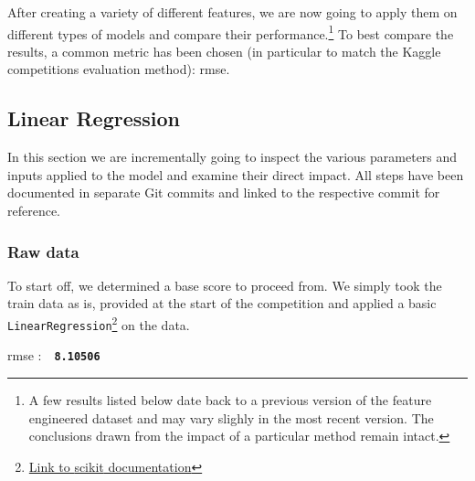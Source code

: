 \newcommand{\rmse}[1]{
	\vspace*{-2mm}
	\begin{center}
		\begin{tcolorbox}[colback=white, colframe=iwiPurple, halign=flush center, width=0.8\linewidth, boxrule=1pt, arc=4mm]
				\Acrshort{rmse} :\ \ \textbf{\texttt{#1}}
		\end{tcolorbox}
	\vspace*{-2mm}
	\end{center}
}


After creating a variety of different features, we are now going to apply them on different types of models and compare their performance.\footnote{A few results listed below date back to a previous version of the feature engineered dataset and may vary slighly in the most recent version. The conclusions drawn from the impact of a particular method remain intact.} To best compare the results, a common metric has been chosen (in particular to match the Kaggle competitions evaluation method): \acrfull{rmse}.

\subsection{Linear Regression}

In this section we are incrementally going to inspect the various parameters and inputs applied to the model and examine their direct impact. All steps have been documented in separate Git commits and linked to the respective commit for reference.

\subsubsection{Raw data}

To start off, we determined a base score to proceed from. We simply took the train data as is, provided at the start of the competition and applied a basic \texttt{LinearRegression}\footnote{\href{https://scikit-learn.org/stable/modules/generated/sklearn.linear_model.LinearRegression.html\#sklearn.linear_model.LinearRegression}{Link to \gls{scikit} documentation}} on the data.
\rmse{8.10506}


